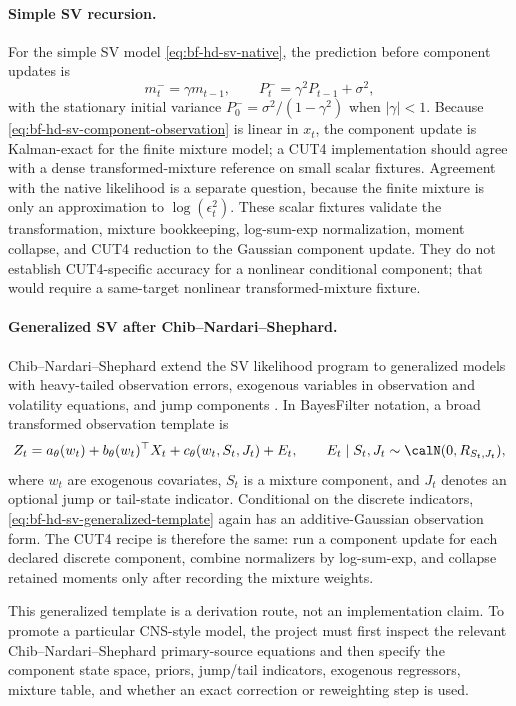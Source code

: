 \paragraph{Simple SV recursion.}
For the simple SV model \eqref{eq:bf-hd-sv-native}, the prediction before
component updates is
\[
  m_t^-=\gamma m_{t-1},\qquad
  P_t^-=\gamma^2P_{t-1}+\sigma^2,
  \label{eq:bf-hd-sv-simple-predict}
\]
with the stationary initial variance \(P_0^-=\sigma^2/(1-\gamma^2)\) when
\(|\gamma|<1\).  Because \eqref{eq:bf-hd-sv-component-observation} is linear in
\(x_t\), the component update is Kalman-exact for the finite mixture model; a
CUT4 implementation should agree with a dense transformed-mixture reference on
small scalar fixtures.  Agreement with the native likelihood is a separate
question, because the finite mixture is only an approximation to
\(\log(\epsilon_t^2)\).  These scalar fixtures validate the transformation,
mixture bookkeeping, log-sum-exp normalization, moment collapse, and CUT4
reduction to the Gaussian component update.  They do not establish
CUT4-specific accuracy for a nonlinear conditional component; that would
require a same-target nonlinear transformed-mixture fixture.

\paragraph{Generalized SV after Chib--Nardari--Shephard.}
Chib--Nardari--Shephard extend the SV likelihood program to generalized models
with heavy-tailed observation errors, exogenous variables in observation and
volatility equations, and jump components \citep{chib2002mcmcsv}.  In
BayesFilter notation, a broad transformed observation template is
\begin{equation}
  Z_t
  =
  a_\theta(w_t)
  + b_\theta(w_t)^\top X_t
  + c_\theta(w_t,S_t,J_t)
  + E_t,
  \qquad
  E_t\mid S_t,J_t\sim\calN(0,R_{S_t,J_t}),
  \label{eq:bf-hd-sv-generalized-template}
\end{equation}
where \(w_t\) are exogenous covariates, \(S_t\) is a mixture component, and
\(J_t\) denotes an optional jump or tail-state indicator.  Conditional on the
discrete indicators, \eqref{eq:bf-hd-sv-generalized-template} again has an
additive-Gaussian observation form.  The CUT4 recipe is therefore the same:
run a component update for each declared discrete component, combine
normalizers by log-sum-exp, and collapse retained moments only after recording
the mixture weights.

This generalized template is a derivation route, not an implementation claim.
To promote a particular CNS-style model, the project must first inspect the
relevant Chib--Nardari--Shephard primary-source equations and then specify the
component state space, priors, jump/tail indicators, exogenous regressors,
mixture table, and whether an exact correction or reweighting step is used.

